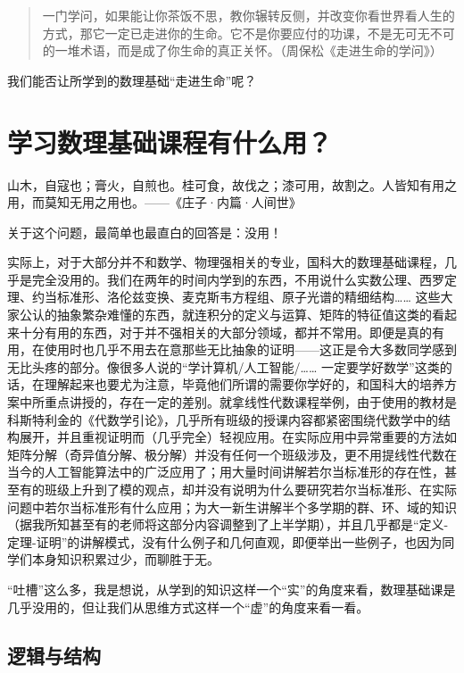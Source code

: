 \documentclass{ctexart}
\begin{document}
\begin{quotation}
  \kaishu
  一门学问，如果能让你茶饭不思，教你辗转反侧，并改变你看世界看人生的方式，那它一定已走进你的生命。它不是你要应付的功课，不是无可无不可的一堆术语，而是成了你生命的真正关怀。（周保松《走进生命的学问》）
\end{quotation}

\noindent 我们能否让所学到的数理基础“走进生命”呢？

\section{学习数理基础课程有什么用？}
\vspace{0.5cm}
{\hfill \kaishu 山木，自寇也；膏火，自煎也。桂可食，故伐之；漆可用，故割之。人皆知有用之用，而莫知无用之用也。——《庄子·内篇·人间世》}
\vspace{0.5cm}

关于这个问题，最简单也最直白的回答是：没用！

实际上，对于大部分并不和数学、物理强相关的专业，国科大的数理基础课程，几乎是完全没用的。我们在两年的时间内学到的东西，不用说什么实数公理、西罗定理、约当标准形、洛伦兹变换、麦克斯韦方程组、原子光谱的精细结构…… 这些大家公认的抽象繁杂难懂的东西，就连积分的定义与运算、矩阵的特征值这类的看起来十分有用的东西，对于并不强相关的大部分领域，都并不常用。即便是真的有用，在使用时也几乎不用去在意那些无比抽象的证明——这正是令大多数同学感到无比头疼的部分。像很多人说的“学计算机/人工智能/…… 一定要学好数学”这类的话，在理解起来也要尤为注意，毕竟他们所谓的需要你学好的，和国科大的培养方案中所重点讲授的，存在一定的差别。就拿线性代数课程举例，由于使用的教材是科斯特利金的《代数学引论》，几乎所有班级的授课内容都紧密围绕代数学中的结构展开，并且重视证明而（几乎完全）轻视应用。在实际应用中异常重要的方法如矩阵分解（奇异值分解、极分解）并没有任何一个班级涉及，更不用提线性代数在当今的人工智能算法中的广泛应用了；用大量时间讲解若尔当标准形的存在性，甚至有的班级上升到了模的观点，却并没有说明为什么要研究若尔当标准形、在实际问题中若尔当标准形有什么应用；为大一新生讲解半个多学期的群、环、域的知识（据我所知甚至有的老师将这部分内容调整到了上半学期），并且几乎都是“定义-定理-证明”的讲解模式，没有什么例子和几何直观，即便举出一些例子，也因为同学们本身知识积累过少，而聊胜于无。

“吐槽”这么多，我是想说，从学到的知识这样一个“实”的角度来看，数理基础课是几乎没用的，但让我们从思维方式这样一个“虚”的角度来看一看。

\subsection{逻辑与结构}
\end{document}

